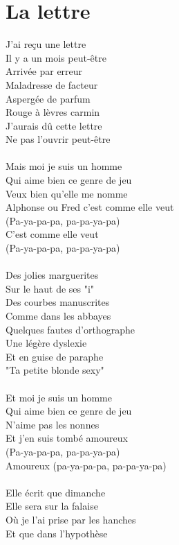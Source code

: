 \section*{La lettre}
J'ai reçu une lettre\\
Il y a un mois peut-être\\
Arrivée par erreur\\
Maladresse de facteur\\
Aspergée de parfum\\
Rouge à lèvres carmin\\
J'aurais dû cette lettre\\
Ne pas l'ouvrir peut-être\\\\
Mais moi je suis un homme\\
Qui aime bien ce genre de jeu\\
Veux bien qu'elle me nomme\\
Alphonse ou Fred c'est comme elle veut\\
(Pa-ya-pa-pa, pa-pa-ya-pa)\\
C'est comme elle veut\\
(Pa-ya-pa-pa, pa-pa-ya-pa)\\\\
Des jolies marguerites\\
Sur le haut de ses "i"\\
Des courbes manuscrites\\
Comme dans les abbayes\\
Quelques fautes d'orthographe\\
Une légère dyslexie\\
Et en guise de paraphe\\
"Ta petite blonde sexy"\\\\
Et moi je suis un homme\\
Qui aime bien ce genre de jeu\\
N'aime pas les nonnes\\
Et j'en suis tombé amoureux\\
(Pa-ya-pa-pa, pa-pa-ya-pa)\\
Amoureux (pa-ya-pa-pa, pa-pa-ya-pa)\\\\
Elle écrit que dimanche\\
Elle sera sur la falaise\\
Où je l'ai prise par les hanches\\
Et que dans l'hypothèse\\
